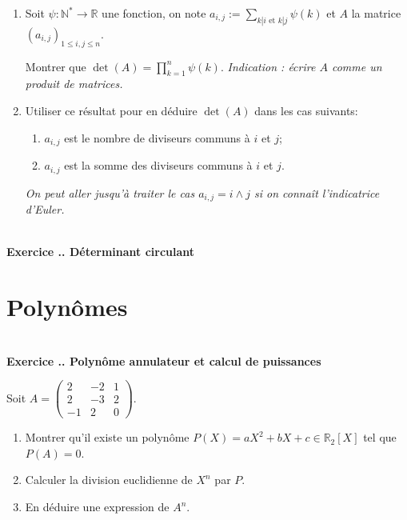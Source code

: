 \documentclass{article}
\newcommand{\mb}[1]{\mathbb{#1}}
\newcounter{exo}
\newcommand{\exercice}[1][\null]{\textbf{\\ Exercice \thesection.\theexo. #1} \addtocounter{exo}{1}}
\begin{document}
\begin{enumerate}

\item Soit $\psi : \mb{N}^* \rightarrow \mb{R}$ une fonction, on note $\displaystyle a_{i,j} := \sum_{k|i \text{ et } k |j} \psi(k)$ et $A$ la matrice $(a_{i,j})_{1 \le i, j \le n}$.

Montrer que $ \det(A) = \prod_{k=1}^n \psi(k)$. \emph{Indication : écrire $A$ comme un produit de matrices.}

\item Utiliser ce résultat pour en déduire $\det(A)$ dans les cas suivants:

\begin{enumerate}

\item $a_{i,j}$ est le nombre de diviseurs communs à $i$ et $j$;

\item  $a_{i,j}$ est la somme des diviseurs communs à $i$ et $j$.

\end{enumerate}

\emph{On peut aller jusqu'à traiter le cas $a_{i,j} = i \wedge j$ si on connaît l'indicatrice d'Euler.}

\end{enumerate}



\exercice[Déterminant circulant]













\section{Polynômes}


\exercice[Polynôme annulateur et calcul de puissances]

Soit $A = \begin{pmatrix} 2 & -2 & 1 \\ 2& -3& 2 \\ -1 & 2 & 0 \end{pmatrix}$.

\begin{enumerate}

\item Montrer qu'il existe un polynôme $P(X) = a X^2 + b X + c \in \mb{R}_2[X]$ tel que $P(A) = 0$.

\item Calculer la division euclidienne de $X^n$ par $P$.

\item En déduire une expression de $A^n$.

\end{enumerate}
\end{document}
